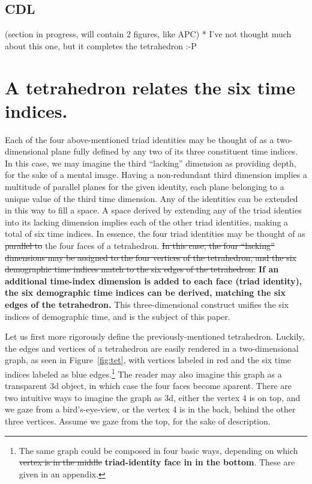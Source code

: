 \documentclass[11pt,oneside,a4paper]{article} %
\newcommand\tgh[1]{\raisebox{-.25\height}{\texttt{[image: Figures/triadtable/triad\#1.pdf]}}}
\begin{document}
\subsection*{CDL}%
(section in progress, will contain 2 figures, like APC)
* I've not thought much about this one, but it completes the tetrahedron :-P

\section*{A tetrahedron relates the six time indices.}
Each of the four above-mentioned triad identities may be thought of as a
two-dimensional plane fully defined by any two of its three constituent time
indices.
In this case, we may imagine the third ``lacking'' dimension as providing
depth, for the sake of a mental image.
Having a non-redundant third dimension implies a multitude of parallel planes
for the given identity, each plane belonging to a unique value of the third time dimension. Any of the
identities can be extended in this way to fill a space. A space derived by
extending any of the triad identies into its lacking dimension implies each of the
other triad identities, making a total of six time indices. In essence, the
four triad identities may be thought of as \sout{parallel to }the four faces of a
tetrahedron. \sout{In this case, the four ``lacking'' dimensions may be assigned to
the four vertices of the tetrahedron, and the six demographic time indices match
to the six edges of the tetrahedron.} \textbf{If an additional time-index dimension is added to each face (triad identity), the six demographic time indices can be derived, matching the six edges of the tetrahedron.} This three-dimensional construct
unifies the six indices of demographic time, and is the subject of this paper.

Let us first more rigorously define the previously-mentioned tetrahedron.
Luckily, the edges and vertices of a tetrahedron are easily rendered in a
two-dimensional graph, as seen in Figure~\ref{fig:tet}, with vertices labeled
in red and the six time indices labeled as blue edges.\footnote{The same graph
could be composed in four basic ways, depending on which \sout{vertex is in the
middle} \textbf{triad-identity face in in the bottom}. These are given in an appendix.} The reader may also imagine this graph
as a transparent 3d object, in which case the four faces become aparent. There are two intuitive ways to imagine the graph as 3d, either the vertex 4 is on top, and we gaze from a bird's-eye-view, or the
vertex 4 is in the back, behind the other three vertices. Assume we
gaze from the top, for the sake of description. 
\end{document}
